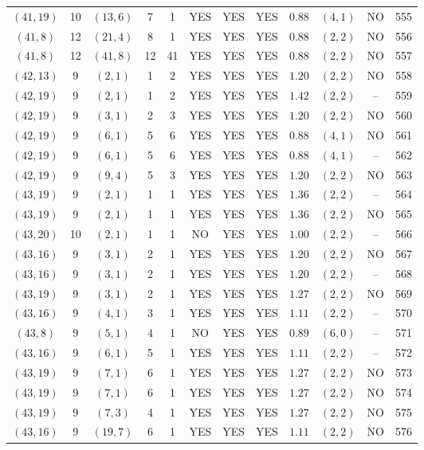 \begin{longtable}{|c|c|c|c|c|c|c|c|c|c|c|c|}
$(41,19)$ & 10 & $(13,6)$ & 7 & 1 & YES & YES & YES & $0.88$ & $(4,1)$ & NO & 555\\
$(41,8)$ & 12 & $(21,4)$ & 8 & 1 & YES & YES & YES & $0.88$ & $(2,2)$ & NO & 556\\
$(41,8)$ & 12 & $(41,8)$ & 12 & 41 & YES & YES & YES & $0.88$ & $(2,2)$ & NO & 557\\
$(42,13)$ & 9 & $(2,1)$ & 1 & 2 & YES & YES & YES & $1.20$ & $(2,2)$ & NO & 558\\
$(42,19)$ & 9 & $(2,1)$ & 1 & 2 & YES & YES & YES & $1.42$ & $(2,2)$ & -- & 559\\
$(42,19)$ & 9 & $(3,1)$ & 2 & 3 & YES & YES & YES & $1.20$ & $(2,2)$ & NO & 560\\
$(42,19)$ & 9 & $(6,1)$ & 5 & 6 & YES & YES & YES & $0.88$ & $(4,1)$ & NO & 561\\
$(42,19)$ & 9 & $(6,1)$ & 5 & 6 & YES & YES & YES & $0.88$ & $(4,1)$ & -- & 562\\
$(42,19)$ & 9 & $(9,4)$ & 5 & 3 & YES & YES & YES & $1.20$ & $(2,2)$ & NO & 563\\
$(43,19)$ & 9 & $(2,1)$ & 1 & 1 & YES & YES & YES & $1.36$ & $(2,2)$ & -- & 564\\
$(43,19)$ & 9 & $(2,1)$ & 1 & 1 & YES & YES & YES & $1.36$ & $(2,2)$ & NO & 565\\
$(43,20)$ & 10 & $(2,1)$ & 1 & 1 & NO & YES & YES & $1.00$ & $(2,2)$ & -- & 566\\
$(43,16)$ & 9 & $(3,1)$ & 2 & 1 & YES & YES & YES & $1.20$ & $(2,2)$ & NO & 567\\
$(43,16)$ & 9 & $(3,1)$ & 2 & 1 & YES & YES & YES & $1.20$ & $(2,2)$ & -- & 568\\
$(43,19)$ & 9 & $(3,1)$ & 2 & 1 & YES & YES & YES & $1.27$ & $(2,2)$ & NO & 569\\
$(43,16)$ & 9 & $(4,1)$ & 3 & 1 & YES & YES & YES & $1.11$ & $(2,2)$ & -- & 570\\
$(43,8)$ & 9 & $(5,1)$ & 4 & 1 & NO & YES & YES & $0.89$ & $(6,0)$ & -- & 571\\
$(43,16)$ & 9 & $(6,1)$ & 5 & 1 & YES & YES & YES & $1.11$ & $(2,2)$ & -- & 572\\
$(43,19)$ & 9 & $(7,1)$ & 6 & 1 & YES & YES & YES & $1.27$ & $(2,2)$ & NO & 573\\
$(43,19)$ & 9 & $(7,1)$ & 6 & 1 & YES & YES & YES & $1.27$ & $(2,2)$ & NO & 574\\
$(43,19)$ & 9 & $(7,3)$ & 4 & 1 & YES & YES & YES & $1.27$ & $(2,2)$ & NO & 575\\
$(43,16)$ & 9 & $(19,7)$ & 6 & 1 & YES & YES & YES & $1.11$ & $(2,2)$ & NO & 576\\

\end{longtable}
